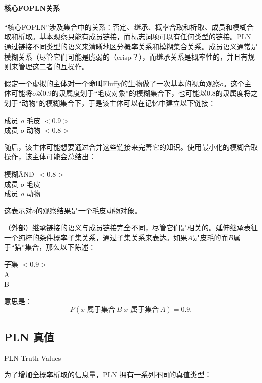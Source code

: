 \paragraph{核心FOPLN关系}

“核心FOPLN”涉及集合中的关系：否定、继承、概率合取和析取、成员和模糊合取和析取。基本观察只能有成员链接，而标志词项可以有任何类型的链接。PLN通过链接不同类型的语义来清晰地区分概率关系和模糊集合关系。成员语义通常是模糊关系（尽管它们可能是脆弱的（crisp？），而继承关系是概率性的，并且有规则来管理这二者的互操作。

假定一个虚拟的主体对一个命叫Fluffy的生物做了一次基本的视角观察$o$。这个主体可能将$o$以0.9的隶属度划于“毛皮对象”的模糊集合下，也可能以0.8的隶属度将之划于“动物”的模糊集合下，于是该主体可以在记忆中建立以下链接：

 \begin{tabbing}
\=成员 $o$ 毛皮 $< 0.9 >$ \\
\>成员 $o$ 动物 $< 0.8 >$ \\
\end{tabbing}

随后，该主体可能想要通过合并这些链接来完善它的知识。使用最小化的模糊合取操作，该主体可能会总结出：

 \begin{tabbing}
模糊\=AND\ $<0.8>$\\
\> 成员 $o$ 毛皮 \\
\> 成员 $o$ 动物 \\
\end{tabbing}

这表示对$o$的观察结果是一个毛皮动物对象。

（外部）继承链接的语义与成员链接完全不同，尽管它们是相关的。延伸继承表征一个纯粹的条件概率子集关系，通过子集关系来表达。如果$A$是皮毛的而$B$属于“猫”集合，那么以下陈述：

\begin{tabbing}
\=子集 $<0.9>$\\
\>A\\
\>B\\
\end{tabbing}

意思是：$$P(x \mbox{ 属于集合}\ B\vert x \mbox{ 属于集合}\ A) = 0.9.$$ 

\subsection{PLN 真值}{PLN Truth Values}

为了增加全概率析取的信息量，PLN 拥有一系列不同的真值类型：

